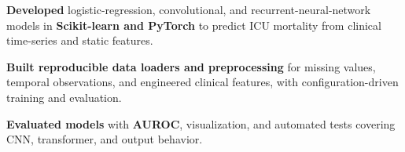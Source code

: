 \begin{bullets}
	\item \textbf{Developed} logistic-regression, convolutional, and recurrent-neural-network models in \textbf{Scikit-learn and PyTorch} to predict ICU mortality from clinical time-series and static features.
	\item \textbf{Built reproducible data loaders and preprocessing} for missing values, temporal observations, and engineered clinical features, with configuration-driven training and evaluation.
	\item \textbf{Evaluated models} with \textbf{AUROC}, visualization, and automated tests covering CNN, transformer, and output behavior.
\end{bullets}